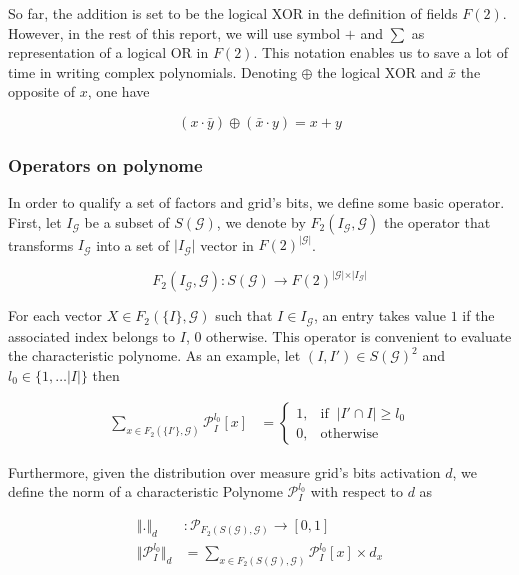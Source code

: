 \documentclass[a4paper, 11pt]{article}
\begin{document}
So far, the addition is set to be the logical XOR in the definition of fields $F(2)$. However, in the rest of this report, we will use symbol $+$ and $\sum$ as representation of a logical OR in $F(2)$. This notation enables us to save a lot of time in writing complex polynomials. Denoting $\oplus$ the logical XOR and $\bar{x}$ the opposite of $x$, one have

\begin{equation*}
(x \cdot \bar{y}) \oplus (\bar{x} \cdot y) = x + y 
\end{equation*}  

\subsubsection*{Operators on polynome}

In order to qualify a set of factors and grid's bits, we define some basic operator. First, let  $I_{\mathcal{G}}$ be a subset of $S(\mathcal{G})$, we denote by $F_2(I_{\mathcal{G}}, \mathcal{G})$ the operator that transforms $I_{\mathcal{G}}$ into a set of $\vert I_{\mathcal{G}} \vert$ vector in $F(2)^{\vert \mathcal{G} \vert}$. 

\begin{equation*}
F_2(I_{\mathcal{G}}, \mathcal{G})  : S(\mathcal{G}) \rightarrow  F(2)^{\vert \mathcal{G} \vert \times \vert I_{\mathcal{G}} \vert} 
\end{equation*}

For each vector $X \in F_2(\{I\}, \mathcal{G})$ such that $I\in I_{\mathcal{G}}$, an entry takes value $1$ if the associated index belongs to $I$, 0 otherwise. This operator is convenient to evaluate the characteristic polynome. As an example, let $(I, I') \in S(\mathcal{G})^{2}$ and $l_0 \in \{ 1, \ldots \vert I \vert \}$ then 

\begin{align*}
\sum_{x \in F_2(\lbrace I' \rbrace, \mathcal{G})} \mathcal{P}_I^{l_0} \left[ x \right]  &= \begin{cases} 1, & \text{if }\ \vert I'\cap I \vert \geq l_0 \\ 0, & \text{otherwise} \end{cases}
\end{align*}

Furthermore, given the distribution over measure grid's bits activation $d$, we define the norm of a characteristic Polynome $\mathcal{P}_I^{l_0}$ with respect to $d$ as

\begin{align*}
\Vert . \Vert_{d} &: \mathcal{P}_{F_2(S(\mathcal{G}), \mathcal{G})} \rightarrow \left[ 0, 1\right] \\
\Vert \mathcal{P}_I^{l_0} \Vert_{d} &= \sum_{x \in F_2(S(\mathcal{G}), \mathcal{G})} \mathcal{P}_I^{l_0}\left[ x \right] \times d_x
\end{align*}
\end{document}
